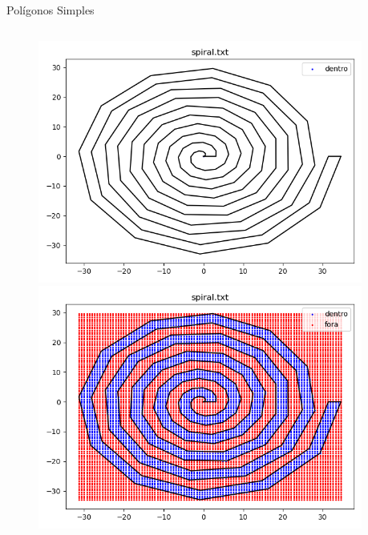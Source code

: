 \documentclass[aspectratio=169]{beamer}
\begin{document}
\begin{frame}{Polígonos Simples}
  \begin{columns}
    \begin{center}
      \begin{figure}
        \begin{overprint}
        \includegraphics[width=1.0\textwidth]{figures/spiral.png}
        \includegraphics[width=1.0\textwidth]{figures/spiral_grid.png}
        \end{overprint}
      \end{figure}
    \end{center}
    \begin{center}

\end{center}
\end{columns}
\end{frame}
\end{document}
